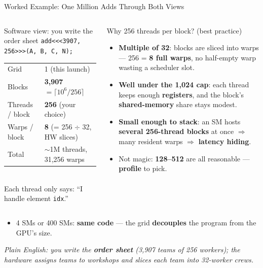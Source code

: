 \documentclass[aspectratio=169]{beamer}
\newcommand{\kw}[1]{\textbf{\textcolor{kwblue}{#1}}}
\newcommand{\pe}[1]{\par{\setlength{\fboxsep}{2.5pt}\noindent\colorbox{navy!9}{\parbox{\dimexpr\textwidth-5pt\relax}{\footnotesize\itshape Plain English: #1}}}}
\begin{document}
\begin{frame}{Worked Example: One Million Adds Through Both Views}
  \begin{columns}[t]
    \begin{block}{Software view: you write the order sheet}
      \footnotesize
      \texttt{add<<<3907, 256>>>(A, B, C, N);}\\[4pt]
      {\scriptsize\setlength{\tabcolsep}{3pt}
      \begin{tabular}{@{}ll@{}}
        \toprule
        Grid & 1 (this launch) \\
        Blocks & \kw{3{,}907} $= \lceil 10^6/256 \rceil$ \\
        Threads / block & \kw{256} (your choice) \\
        Warps / block & \kw{8} (= 256 $\div$ 32, HW slices) \\
        Total & $\sim$1M threads, 31{,}256 warps \\
        \bottomrule
      \end{tabular}}\\[4pt]
      Each thread only says: ``I handle element \texttt{idx}.''
    \end{block}
    \begin{block}{Why 256 threads per block? (best practice)}
      \footnotesize
      \begin{itemize}
        \item \kw{Multiple of 32}: blocks are sliced into warps --- 256 = \kw{8 full warps},
              no half-empty warp wasting a scheduler slot.
        \item \kw{Well under the 1{,}024 cap}: each thread keeps enough \kw{registers},
              and the block's \kw{shared-memory} share stays modest.
        \item \kw{Small enough to stack}: an SM hosts \kw{several 256-thread blocks} at once
              $\Rightarrow$ many resident warps $\Rightarrow$ \kw{latency hiding}.
        \item Not magic: \kw{128--512} are all reasonable --- \kw{profile} to pick.
      \end{itemize}
    \end{block}
  \end{columns}
  \smallskip
  \begin{itemize}\footnotesize
    \item 4 SMs or 400 SMs: \kw{same code} --- the grid \kw{decouples} the program from the GPU's size.
  \end{itemize}
  \pe{you write the \kw{order sheet} (3,907 teams of 256 workers); the hardware assigns teams to workshops and slices each team into 32-worker crews.}
\end{frame}
\end{document}
